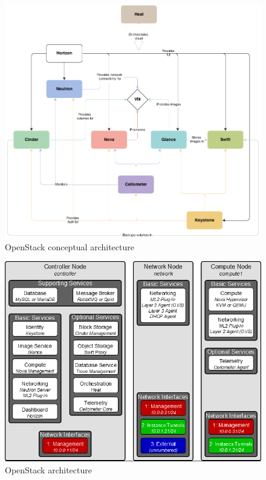 \begin{figure}[ht!]
\centering
\includegraphics[width=\textwidth]{openstack_conceptual_architecture.png}
\caption{OpenStack conceptual architecture}
\label{overflow}
\end{figure}


\begin{figure}[ht!]
\centering
\includegraphics[width=\textwidth]{openstack_architecture.png}
\caption{OpenStack architecture}
\label{overflow}
\end{figure}

